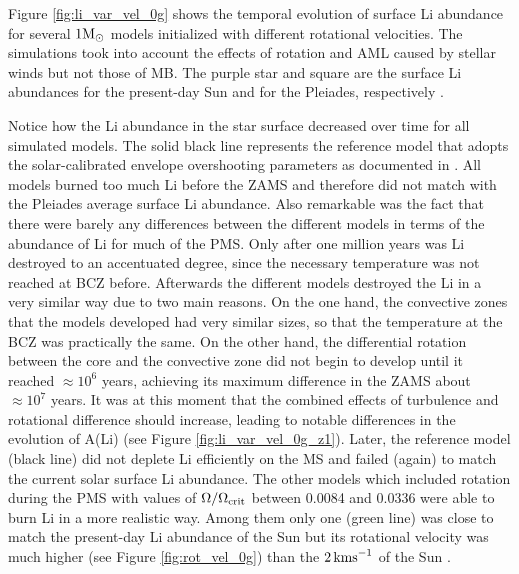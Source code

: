 \documentclass[fleqn,usenatbib]{mnras}
\begin{document}
Figure \ref{fig:li_var_vel_0g} shows the temporal evolution of surface Li abundance for several $1\mathrm{M}_\odot$ models initialized with different rotational velocities. The simulations took into account the effects of rotation and AML caused by stellar winds but not those of MB. The purple star and square are the surface Li abundances for the present-day Sun \citep{Asplund2009} and for the Pleiades, respectively \citep{Sestito2005}.\par

Notice how the Li abundance in the star surface decreased over time for all simulated models. The solid black line represents the reference model that adopts the solar-calibrated envelope overshooting parameters as documented in \citet{Choi2016}. All models burned too much Li before the ZAMS and therefore did not match with the Pleiades average surface Li abundance. Also remarkable was the fact that there were barely any differences between the different models in terms of the abundance of Li for much of the PMS. Only after one million years was Li destroyed to an accentuated degree, since the necessary temperature was not reached at BCZ before. Afterwards the different models destroyed the Li in a very similar way due to two main reasons. On the one hand, the convective zones that the models developed had very similar sizes, so that the temperature at the BCZ was practically the same. On the other hand, the differential rotation between the core and the convective zone did not begin to develop until it reached $ \approx 10^6$ years, achieving its maximum difference in the ZAMS about $ \approx 10^7$ years. It was at this moment that the combined effects of turbulence and rotational difference should increase, leading to notable differences in the evolution of A(Li) (see Figure \ref{fig:li_var_vel_0g_z1}). Later, the reference model (black line) did not deplete Li efficiently on the MS and failed (again) to match the current solar surface Li abundance. The other models which included rotation during the PMS with values of $\Omega / \Omega_{\mathrm{crit}}$ between 0.0084 and 0.0336 were able to burn Li in a more realistic way. Among them only one (green line) was close to match the present-day Li abundance of the Sun but its rotational velocity was much higher (see Figure \ref{fig:rot_vel_0g}) than the $2\,\mathrm{kms}^{-1}$ of the Sun \citep{Gill2012}. \par
\end{document}
